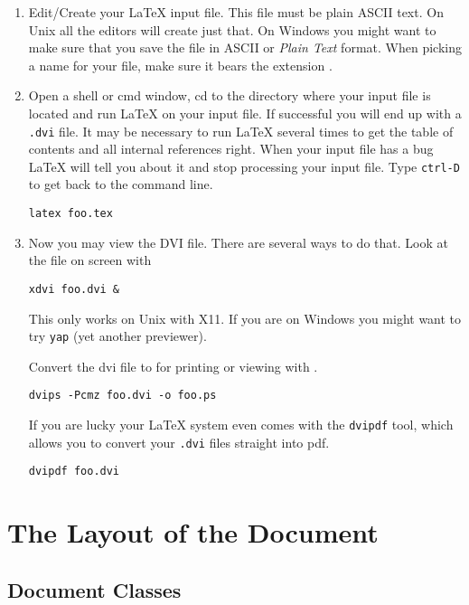 \begin{enumerate}
\item 
  
  Edit/Create your \LaTeX{} input file. This file must be plain ASCII
  text.  On Unix all the editors will create just that. On Windows you
  might want to make sure that you save the file in ASCII or
  \emph{Plain Text} format.  When picking a name for your file, make
  sure it bears the extension .

\item 

Open a shell or cmd window, cd to the directory where your input file is located and run \LaTeX{} on your input file. If successful you will end up with a
\texttt{.dvi} file. It may be necessary to run \LaTeX{} several times to get
the table of contents and all internal references right. When your input
file has a bug \LaTeX{} will tell you about it and stop processing your
input file. Type \texttt{ctrl-D} to get back to the command line.
\begin{lscommand}
\verb+latex foo.tex+
\end{lscommand}

\item 
Now you may view the DVI file. There are several ways to do that. Look at the file on screen with
\begin{lscommand}
\verb+xdvi foo.dvi &+
\end{lscommand}
This only works on Unix with X11. If you are on Windows you might want to try \texttt{yap} (yet another previewer).

Convert the dvi file to \PSi{} for printing or viewing with .
\begin{lscommand}
\verb+dvips -Pcmz foo.dvi -o foo.ps+
\end{lscommand}

If you are lucky your \LaTeX{} system even comes with the \texttt{dvipdf} tool, which allows
you to convert your \texttt{.dvi} files straight into pdf.
\begin{lscommand}
\verb+dvipdf foo.dvi+
\end{lscommand}

\end{enumerate}

 
\section{The Layout of the Document}
 
\subsection {Document Classes}\label{sec:documentclass}

